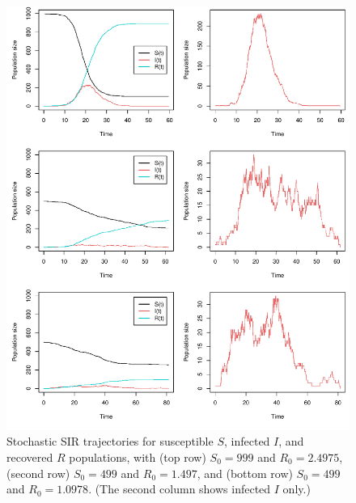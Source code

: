 \documentclass[12pt,titlepage]{article}
\begin{document}
%
%
\begin{figure}
    \centering
    	\includegraphics[width=6in]{Fig1.pdf}
    \caption{Stochastic SIR trajectories for susceptible $S$, infected $I$, and recovered $R$ populations, with (top row) 
    $S_0=999$ and $R_0=2.4975$, (second row) $S_0=499$ and $R_0=1.497$, and (bottom row) $S_0=499$ and $R_0=1.0978$.  (The 
    second column shows infected $I$ only.)}
	\label{fig:SIRRh_traj}
\end{figure}
%
\end{document}
